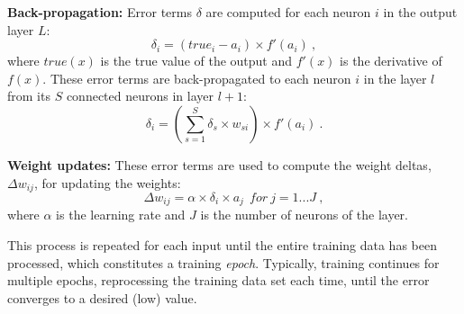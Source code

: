 {\bf Back-propagation:}
Error terms $\delta$ are computed for each neuron $i$ in the output layer $L$:
\begin{equation}
\delta_{i} = \left(true_{i} - a_{i}\right) \times f'(a_{i})\ ,
\label{eqn:output_error_term}
\end{equation}
where $true(x)$ is the true value of the output and $f'(x)$ is the derivative of $f(x)$.
These error terms are back-propagated to each neuron $i$ in the layer $l$ from its $S$ connected neurons in layer $l+1$:
\begin{equation}
\delta_{i} = \left(\sum\limits_{s=1}^{S}\delta_{s} \times w_{si}\right) \times f'(a_{i}) \ .
\label{eqn:other_error_term}
\end{equation}

{\bf Weight updates:}
These error terms are used to compute the weight deltas, $\Delta w_{ij}$, for updating the weights:
\begin{equation}
\Delta w_{ij} = \alpha \times \delta_{i} \times a_{j} ~~for~ j = 1...J \ ,
\label{eqn:weight_delta}
\end{equation}
where $\alpha$ is the learning rate and $J$ is the number of neurons of the layer.  

This process is repeated for each input until the entire training data has been processed, which constitutes a training {\it epoch}. Typically, training continues for multiple epochs, reprocessing the training data set each time, until the error converges to a desired (low) value.

